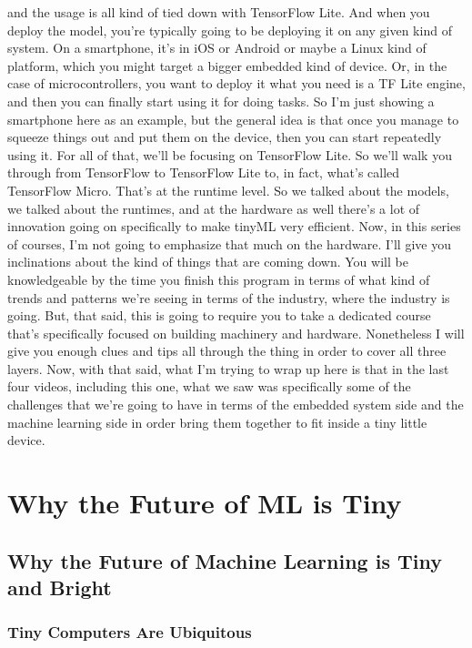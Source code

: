 and the usage is all kind of tied down with TensorFlow Lite.
And when you deploy the model, you're typically
going to be deploying it on any given kind of system.
On a smartphone, it's in iOS or Android or maybe a Linux
kind of platform, which you might target a bigger embedded kind of device.
Or, in the case of microcontrollers, you want
to deploy it what you need is a TF Lite engine,
and then you can finally start using it for doing tasks.
So I'm just showing a smartphone here as an example,
but the general idea is that once you manage
to squeeze things out and put them on the device,
then you can start repeatedly using it.
For all of that, we'll be focusing on TensorFlow Lite.
So we'll walk you through from TensorFlow to TensorFlow Lite
to, in fact, what's called TensorFlow Micro.
That's at the runtime level.
So we talked about the models, we talked about the runtimes,
and at the hardware as well there's a lot of innovation going on specifically
to make tinyML very efficient.
Now, in this series of courses, I'm not going
to emphasize that much on the hardware.
I'll give you inclinations about the kind of things that are coming down.
You will be knowledgeable by the time you finish this program in terms
of what kind of trends and patterns we're
seeing in terms of the industry, where the industry is going.
But, that said, this is going to require you
to take a dedicated course that's specifically focused
on building machinery and hardware.
Nonetheless I will give you enough clues and tips all through the thing in order
to cover all three layers.
Now, with that said, what I'm trying to wrap up here
is that in the last four videos, including
this one, what we saw was specifically some of the challenges
that we're going to have in terms of the embedded system side
and the machine learning side in order bring them together
to fit inside a tiny little device.



\section{Why the Future of ML is Tiny}

\subsection{Why the Future of Machine Learning is Tiny and Bright}

\subsubsection{Tiny Computers Are Ubiquitous}

